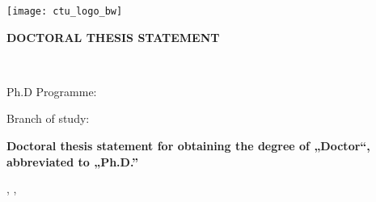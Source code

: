 \pagestyle{empty}
\hypersetup{pageanchor=false} %

%
%
\begin{titlepage}
	\centering
	\textbf{\large\MakeUppercase{\university}}\par
	\vspace{30mm}
	{\texttt{[image: ctu\_logo\_bw]}\par}
	\vspace{34mm}
	\textbf{\large\MakeUppercase{doctoral thesis statement}}\par
\end{titlepage}

\cleardoublepage
{}
\begin{titlepage}
	\centering
	\textbf{\large\MakeUppercase{\university}}\par
	\textbf{\normalsize\faculty}\par
	\textbf{\normalsize\department}\par
	\vspace{42mm}
	{\Large\authorDegree\ \authorName\par}
	\vspace{17mm}
	{\Large\MakeUppercase{\thesisTitle}\par}
	\vspace{29mm}
	Ph.D Programme: \textbf{\PhDProgramme}\par
	Branch of study: \textbf{\branchOfStudy}\par
	\vspace{25mm}
	{\large\textbf{Doctoral thesis statement for obtaining the degree of „Doctor“, abbreviated to „Ph.D.”}\par}
	\vspace{46mm}
	{\Large\submissionPlace, \monthname[\submissionMonth], \submissionYear\par}
\end{titlepage}

\restoregeometry

\clearpage
\hypersetup{pageanchor=true}
\setcounter{page}{1}
\pagestyle{main}





%
%
\chaptermark{\contentsname}
\tableofcontents
